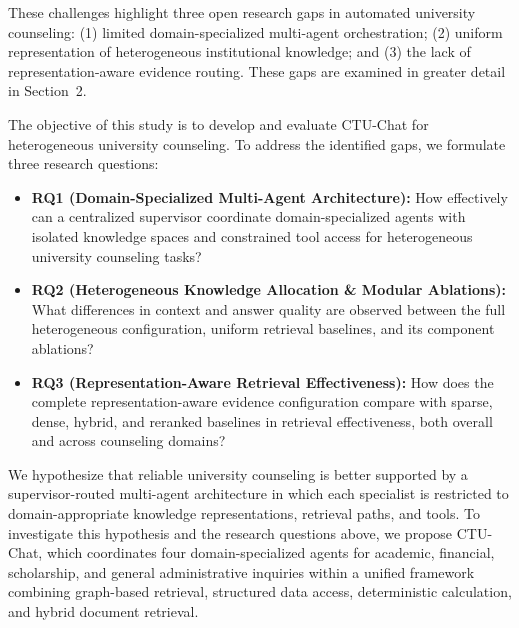 These challenges highlight three open research gaps in automated university counseling: (1) limited domain-specialized multi-agent orchestration; (2) uniform representation of heterogeneous institutional knowledge; and (3) the lack of representation-aware evidence routing. These gaps are examined in greater detail in Section~2.

The objective of this study is to develop and evaluate CTU-Chat for heterogeneous university counseling. To address the identified gaps, we formulate three research questions:
\begin{itemize}
    \setlength{\itemsep}{1.5pt}
    \setlength{\parsep}{0pt}
    \setlength{\parskip}{0pt}

    \item \textbf{RQ1 (Domain-Specialized Multi-Agent Architecture):}
    How effectively can a centralized supervisor coordinate domain-specialized agents with isolated knowledge spaces and constrained tool access for heterogeneous university counseling tasks?

    \item \textbf{RQ2 (Heterogeneous Knowledge Allocation \& Modular Ablations):}
    What differences in context and answer quality are observed between the full heterogeneous configuration, uniform retrieval baselines, and its component ablations?

    \item \textbf{RQ3 (Representation-Aware Retrieval Effectiveness):}
    How does the complete representation-aware evidence configuration compare with sparse, dense, hybrid, and reranked baselines in retrieval effectiveness, both overall and across counseling domains?
\end{itemize}

We hypothesize that reliable university counseling is better supported by a supervisor-routed multi-agent architecture in which each specialist is restricted to domain-appropriate knowledge representations, retrieval paths, and tools. To investigate this hypothesis and the research questions above, we propose CTU-Chat, which coordinates four domain-specialized agents for academic, financial, scholarship, and general administrative inquiries within a unified framework combining graph-based retrieval, structured data access, deterministic calculation, and hybrid document retrieval.


